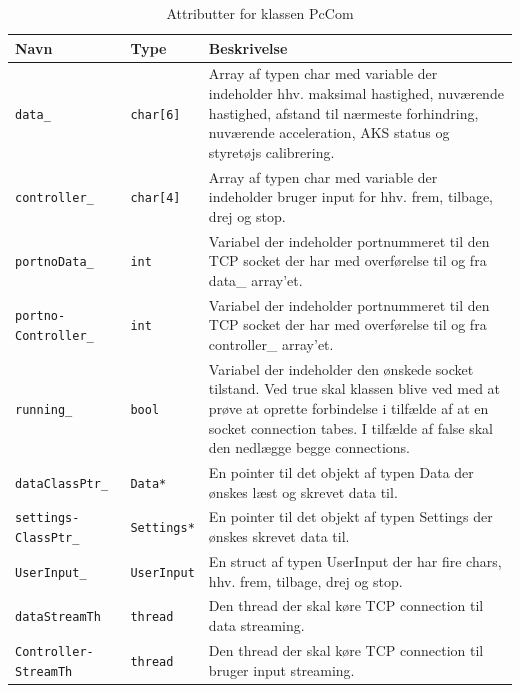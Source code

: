 \begin{table}[h]
\begin{tabularx}{\textwidth}{| Z | Z | L{10cm} |} \hline
Navn & Type & Beskrivelse \\\hline
\texttt{data\_}					& \texttt{char[6]}	&Array af typen char med variable der indeholder hhv. maksimal hastighed, nuværende hastighed, afstand til nærmeste forhindring, nuværende acceleration, AKS status og styretøjs calibrering.\\\hline

\texttt{controller\_}			& \texttt{char[4]}	&Array af typen char med variable der indeholder bruger input for hhv. frem, tilbage, drej og stop.\\\hline

\texttt{portnoData\_}			& \texttt{int}		&Variabel der indeholder portnummeret til den TCP socket der har med overførelse til og fra data\_ array'et.\\\hline

\texttt{portno- Controller\_}	& \texttt{int}		&Variabel der indeholder portnummeret til den TCP socket der har med overførelse til og fra controller\_ array'et.\\\hline

\texttt{running\_}				& \texttt{bool}		&Variabel der indeholder den ønskede socket tilstand. Ved true skal klassen blive ved med at prøve at oprette forbindelse i tilfælde af at en socket connection tabes. I tilfælde af false skal den nedlægge begge connections.\\\hline

\texttt{dataClassPtr\_}			& \texttt{Data*}	&En pointer til det objekt af typen Data der ønskes læst og skrevet data til.\\\hline

\texttt{settings- ClassPtr\_}	& \texttt{Settings*}&En pointer til det objekt af typen Settings der ønskes skrevet data til.\\\hline

\texttt{UserInput\_}			& \texttt{UserInput}&En struct af typen UserInput der har fire chars, hhv. frem, tilbage, drej og stop.\\\hline

\texttt{dataStreamTh}			& \texttt{thread}	&Den thread der skal køre TCP connection til data streaming.\\\hline

\texttt{Controller- StreamTh}		& \texttt{thread}	&Den thread der skal køre TCP connection til bruger input streaming.\\\hline
\end{tabularx}
\caption{Attributter for klassen PcCom}
\label{table:attr_pccom}
\end{table}

